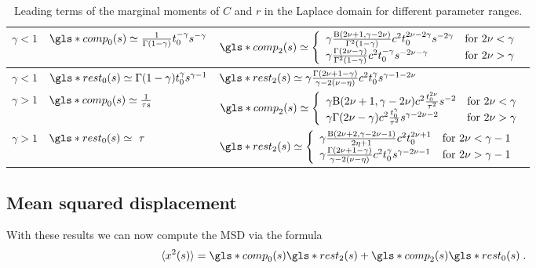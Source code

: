 \begin{center}
\begin{table}[htb]
 \begin{tabular}{||l|l|l||}
 \hline \hline
 \rule[-4mm]{0cm}{1cm} $\gamma<1$ & 
 $\gls*{comp}_0(s) \simeq \frac{1}{\Gamma(1-\gamma)}t_0^{-\gamma} s^{-\gamma}$ & 
 $\gls*{comp}_2(s) \simeq \left\{
\begin{array}{ll}
\gamma \frac{\mathrm{B}(2\nu+1,\gamma-2\nu)}{\Gamma^2(1-\gamma)} c^2 t_0^{2\nu - 2\gamma} s^{-2 \gamma} &\mbox{for } 2\nu < \gamma \\
 \gamma \frac{\Gamma(2\nu-\gamma)}{\Gamma^2(1-\gamma)} c^2 t_0^{-\gamma} s^{-2\nu-\gamma} &\mbox{for } 2\nu > \gamma
\end{array} \right. $ \\ \hline
\rule[-4mm]{0cm}{1cm}  $\gamma<1$ &$\gls*{rest}_0(s) \simeq \Gamma(1-\gamma)t_0^\gamma s^{\gamma-1}$ & $\gls*{rest}_2(s)  \simeq \gamma \frac{\Gamma(2\nu+1-\gamma)}{\gamma- 2(\nu-\eta)}c^2 t_0^\gamma s^{\gamma-1-2\nu}$ \\ \hline
\rule[-4mm]{0cm}{1cm}   $\gamma>1$ & $\gls*{comp}_0(s) \simeq   \frac{1}{\tau s}$ & 
 $\gls*{comp}_2(s) \simeq \left\{ \begin{array}{ll}
 \gamma \mathrm{B}(2\nu+1,\gamma-2\nu)c^2 \frac{t_0^{2\nu}}{\tau^2}  s^{-2} & \mbox{for } 2\nu < \gamma \\
\gamma \Gamma(2\nu-\gamma)c^2\frac{t_0^\gamma}{\tau^2} s^{\gamma-2\nu -2}  & \mbox{for }  2\nu > \gamma
\end{array} \right. $\\ \hline
\rule[-4mm]{0cm}{1cm} $\gamma>1$ &$\gls*{rest}_0(s) \simeq\ \tau$ 
 & $\gls*{rest}_2(s) \simeq \left\{ \begin{array}{ll}
\gamma\frac{\mathrm{B}(2\nu +2, \gamma - 2\nu -1)}{2\eta+1}  c^2 t_0^{2\nu+1}  & \mbox{for } 2\nu < \gamma -1 \\
\gamma \frac{\Gamma(2\nu+1-\gamma)}{\gamma - 2(\nu-\eta)}  c^2 t_0^\gamma   s^{\gamma - 2\nu-1}& \mbox{for } 2\nu > \gamma -1 
\end{array} \right.$ \\ \hline \hline
\end{tabular}
\caption{Leading terms of the marginal moments of $C$  and $r$ in the Laplace domain for different parameter ranges. 
\label{tab:Cr}}
\end{table}
\end{center}



\subsection*{Mean squared displacement}
With these results we can now compute the MSD via the formula
\begin{equation}
\langle x^2(s) \rangle = \gls*{comp}_0(s) \gls*{rest}_2(s) + \gls*{comp}_2(s) \gls*{rest}_0(s) \; .
\end{equation}

